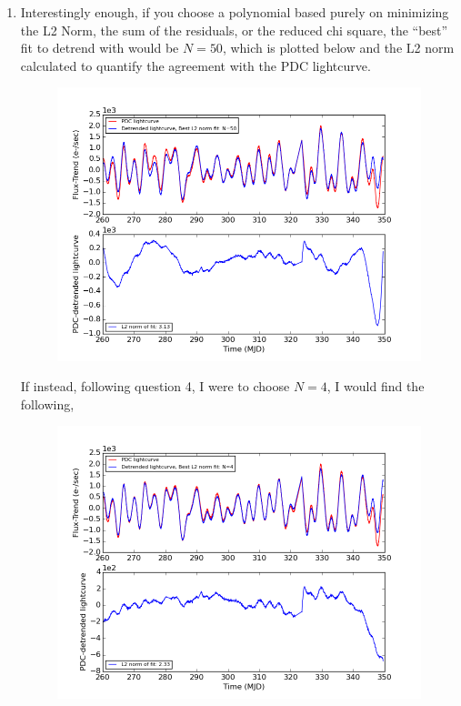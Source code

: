 \documentclass[10pt, preprint]{aastex}
\begin{document}
\begin{enumerate}
\item Interestingly enough, if you choose a polynomial based purely on minimizing the L2 Norm, the sum of the residuals, or the reduced chi square, the ``best'' fit to detrend with would be $N=50$, which is plotted below and the L2 norm calculated to quantify the agreement with the PDC lightcurve.
\begin{figure}[!ht]  \centering
  \includegraphics[width=5in]{hw4_fig5.png}
\end{figure}

If instead, following question 4, I were to choose $N=4$, I would find the following,
\begin{figure}[!ht]  \centering
  \includegraphics[width=5in]{hw4_fig6.png}
\end{figure}


\end{enumerate}
\end{document}
